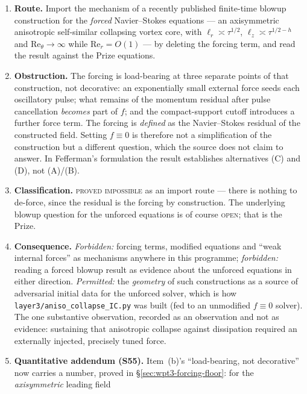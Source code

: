 \documentclass[11pt]{article}
\theoremstyle{definition}
\theoremstyle{remark}
\begin{document}
\begin{enumerate}[label=(\alph*),leftmargin=2.2em]
  \item \textbf{Route.} Import the mechanism of a recently published
    finite-time blowup construction for the \emph{forced} Navier--Stokes
    equations --- an axisymmetric anisotropic self-similar collapsing vortex
    core, with $\ell_r\asymp\tau^{1/2}$, $\ell_z\asymp\tau^{1/2-h}$ and
    $\mathrm{Re}_\theta\to\infty$ while $\mathrm{Re}_r=O(1)$ --- by deleting
    the forcing term, and read the result against the Prize equations.
  \item \textbf{Obstruction.} The forcing is load-bearing at three separate
    points of that construction, not decorative: an exponentially small
    external force seeds each oscillatory pulse; what remains of the momentum
    residual after pulse cancellation \emph{becomes} part of $f$; and the
    compact-support cutoff introduces a further force term. The forcing is
    \emph{defined} as the Navier--Stokes residual of the constructed field.
    Setting $f\equiv0$ is therefore not a simplification of the construction
    but a different question, which the source does not claim to answer. In
    Fefferman's formulation \cite{Fefferman2000} the result establishes
    alternatives (C) and (D), not (A)/(B).
  \item \textbf{Classification.} \textsc{proved impossible} as an import route
    --- there is nothing to de-force, since the residual is the forcing by
    construction. The underlying blowup question for the unforced equations is
    of course \textsc{open}; that is the Prize.
  \item \textbf{Consequence.} \emph{Forbidden:} forcing terms, modified
    equations and ``weak internal forces'' as mechanisms anywhere in this
    programme; \emph{forbidden:} reading a forced blowup result as evidence
    about the unforced equations in either direction.
    \emph{Permitted:} the \emph{geometry} of such constructions as a source
    of adversarial initial data for the unforced solver, which is how
    \texttt{layer3/aniso\_collapse\_IC.py} was built (fed to an unmodified
    $f\equiv0$ solver). The one substantive observation, recorded as an
    observation and not as evidence: sustaining that anisotropic collapse
    against dissipation required an externally injected, precisely tuned
    force.
  \item \textbf{Quantitative addendum (S55).} Item~(b)'s ``load-bearing, not
    decorative'' now carries a number, proved in
    \S\ref{sec:wpt3-forcing-floor}: for the \emph{axisymmetric} leading field

\end{enumerate}
\end{document}
